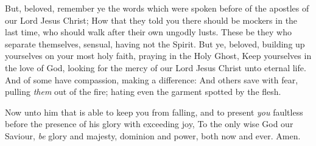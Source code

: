\documentclass[11pt,letterpaper,oneside]{memoir}
\begin{document}
But, beloved, remember ye the words which were spoken before of the
apostles of our Lord Jesus Christ; How that they told you there should
be mockers in the last time, who should walk after their own ungodly
lusts. These be they who separate themselves, sensual, having not the
Spirit. But ye, beloved, building up yourselves on your most holy faith,
praying in the Holy Ghost, Keep yourselves in the love of God, looking
for the mercy of our Lord Jesus Christ unto eternal life. And of some
have compassion, making a difference: And others save with fear, pulling
\emph{them} out of the fire; hating even the garment spotted by the
flesh.

Now unto him that is able to keep you from falling, and to present
\emph{you} faultless before the presence of his glory with exceeding
joy, To the only wise God our Saviour, \emph{be} glory and majesty,
dominion and power, both now and ever. Amen.
\end{document}
